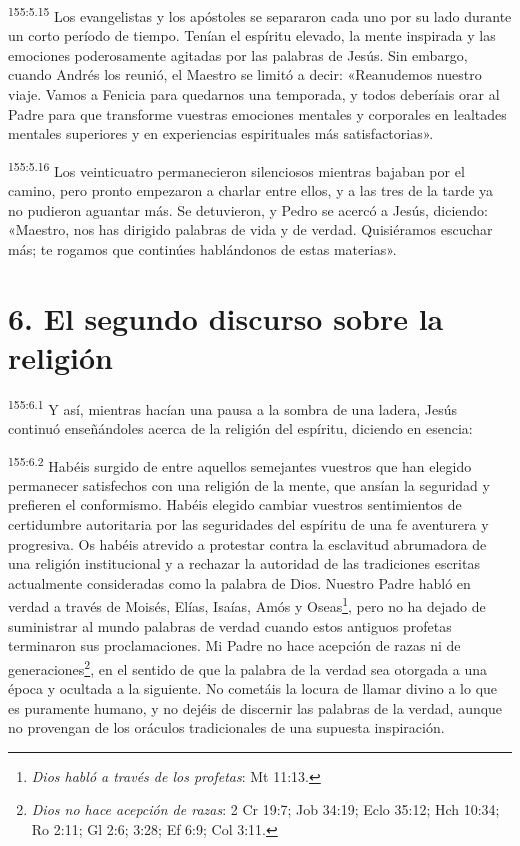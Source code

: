 \par 
\textsuperscript{155:5.15} Los evangelistas y los apóstoles se separaron cada uno por su lado durante un corto período de tiempo. Tenían el espíritu elevado, la mente inspirada y las emociones poderosamente agitadas por las palabras de Jesús. Sin embargo, cuando Andrés los reunió, el Maestro se limitó a decir: «Reanudemos nuestro viaje. Vamos a Fenicia para quedarnos una temporada, y todos deberíais orar al Padre para que transforme vuestras emociones mentales y corporales en lealtades mentales superiores y en experiencias espirituales más satisfactorias».

\par 
\textsuperscript{155:5.16} Los veinticuatro permanecieron silenciosos mientras bajaban por el camino, pero pronto empezaron a charlar entre ellos, y a las tres de la tarde ya no pudieron aguantar más. Se detuvieron, y Pedro se acercó a Jesús, diciendo: «Maestro, nos has dirigido palabras de vida y de verdad. Quisiéramos escuchar más; te rogamos que continúes hablándonos de estas materias».

\section*{6. El segundo discurso sobre la religión}
\par 
\textsuperscript{155:6.1} Y así, mientras hacían una pausa a la sombra de una ladera, Jesús continuó enseñándoles acerca de la religión del espíritu, diciendo en esencia:

\par 
\textsuperscript{155:6.2} Habéis surgido de entre aquellos semejantes vuestros que han elegido permanecer satisfechos con una religión de la mente, que ansían la seguridad y prefieren el conformismo. Habéis elegido cambiar vuestros sentimientos de certidumbre autoritaria por las seguridades del espíritu de una fe aventurera y progresiva. Os habéis atrevido a protestar contra la esclavitud abrumadora de una religión institucional y a rechazar la autoridad de las tradiciones escritas actualmente consideradas como la palabra de Dios. Nuestro Padre habló en verdad a través de Moisés, Elías, Isaías, Amós y Oseas\footnote{\textit{Dios habló a través de los profetas}: Mt 11:13.}, pero no ha dejado de suministrar al mundo palabras de verdad cuando estos antiguos profetas terminaron sus proclamaciones. Mi Padre no hace acepción de razas ni de generaciones\footnote{\textit{Dios no hace acepción de razas}: 2 Cr 19:7; Job 34:19; Eclo 35:12; Hch 10:34; Ro 2:11; Gl 2:6; 3:28; Ef 6:9; Col 3:11.}, en el sentido de que la palabra de la verdad sea otorgada a una época y ocultada a la siguiente. No cometáis la locura de llamar divino a lo que es puramente humano, y no dejéis de discernir las palabras de la verdad, aunque no provengan de los oráculos tradicionales de una supuesta inspiración.

